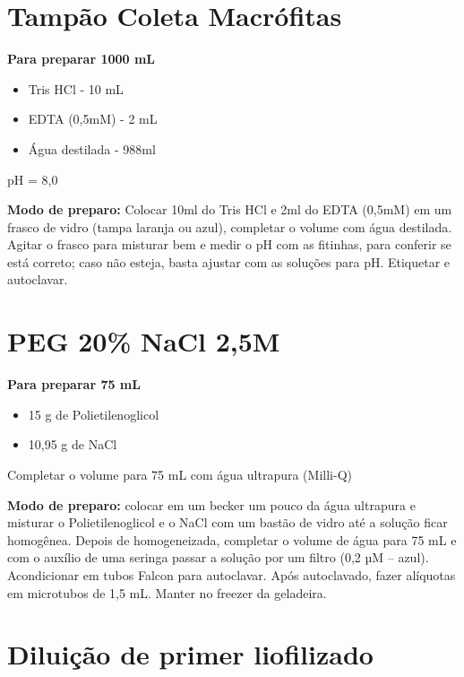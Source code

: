 \documentclass[
  letterpaper,
  DIV=11,
  numbers=noendperiod]{scrreprt}
\begin{document}
\hypertarget{tampuxe3o-coleta-macruxf3fitas}{%
\section{Tampão Coleta
Macrófitas}\label{tampuxe3o-coleta-macruxf3fitas}}

\textbf{Para preparar 1000 mL}

\begin{itemize}
\item
  Tris HCl - 10 mL
\item
  EDTA (0,5mM) - 2 mL
\item
  Água destilada - 988ml
\end{itemize}

pH = 8,0

\textbf{Modo de preparo:} Colocar 10ml do Tris HCl e 2ml do EDTA (0,5mM)
em um frasco de vidro (tampa laranja ou azul), completar o volume com
água destilada. Agitar o frasco para misturar bem e medir o pH com as
fitinhas, para conferir se está correto; caso não esteja, basta ajustar
com as soluções para pH. Etiquetar e autoclavar.

\hypertarget{peg-20-nacl-25m}{%
\section{PEG 20\% NaCl 2,5M}\label{peg-20-nacl-25m}}

\textbf{Para preparar 75 mL}

\begin{itemize}
\item
  15 g de Polietilenoglicol
\item
  10,95 g de NaCl
\end{itemize}

Completar o volume para 75 mL com água ultrapura (Milli-Q)

\textbf{Modo de preparo:} colocar em um becker um pouco da água
ultrapura e misturar o Polietilenoglicol e o NaCl com um bastão de vidro
até a solução ficar homogênea. Depois de homogeneizada, completar o
volume de água para 75 mL e com o auxílio de uma seringa passar a
solução por um filtro (0,2 µM -- azul). Acondicionar em tubos Falcon
para autoclavar. Após autoclavado, fazer alíquotas em microtubos de 1,5
mL. Manter no freezer da geladeira.

\hypertarget{diluiuxe7uxe3o-de-primer-liofilizado}{%
\section{Diluição de primer
liofilizado}\label{diluiuxe7uxe3o-de-primer-liofilizado}}
\end{document}
